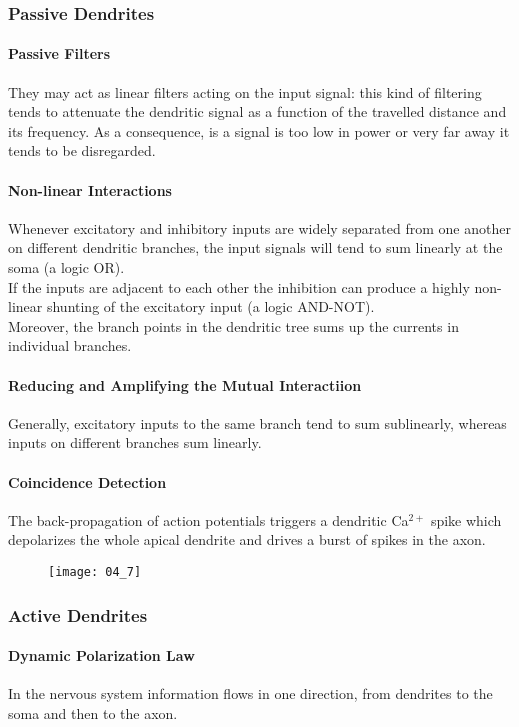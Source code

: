 \subsubsection{Passive Dendrites}
\paragraph{Passive Filters} They may act as linear filters acting on the input signal: this
kind of filtering tends to attenuate the dendritic signal as a function of the travelled
distance and its frequency. As a consequence, is a signal is too low in power or very
far away it tends to be disregarded.
\paragraph{Non-linear Interactions} Whenever excitatory and inhibitory inputs are
widely separated from one another on different dendritic branches, the input signals
will tend to sum linearly at the soma (a logic OR).\\
If the inputs are adjacent to each other the inhibition can produce a highly non-linear
shunting of the excitatory input (a logic AND-NOT).\\
Moreover, the branch points in the dendritic tree sums up the currents in individual
branches.
\paragraph{Reducing and Amplifying the Mutual Interactiion} Generally, excitatory
inputs to the same branch tend to sum sublinearly, whereas inputs on different branches
sum linearly.
\paragraph{Coincidence Detection} The back-propagation of action potentials triggers
a dendritic Ca\({}^{2+}\) spike which depolarizes the whole apical dendrite and drives
a burst of spikes in the axon.
\begin{figure}[H]
    \texttt{[image: 04\_7]}
    \centering
\end{figure}
\subsubsection{Active Dendrites}
\paragraph{Dynamic Polarization Law} In the nervous system information flows in one
direction, from dendrites to the soma and then to the axon.
